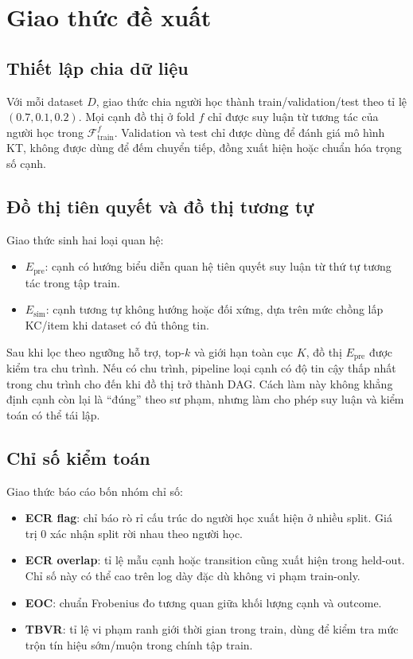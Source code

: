 \documentclass[runningheads]{llncs}
\newcommand{\Epre}{\ensuremath{E_{\text{pre}}}}
\newcommand{\Esim}{\ensuremath{E_{\text{sim}}}}
\begin{document}
\section{Giao thức đề xuất}
\subsection{Thiết lập chia dữ liệu}
Với mỗi dataset $D$, giao thức chia người học thành train/validation/test theo tỉ lệ $(0.7,0.1,0.2)$. Mọi cạnh đồ thị ở fold $f$ chỉ được suy luận từ tương tác của người học trong $\mathcal{F}_{\text{train}}^f$. Validation và test chỉ được dùng để đánh giá mô hình KT, không được dùng để đếm chuyển tiếp, đồng xuất hiện hoặc chuẩn hóa trọng số cạnh.

\subsection{Đồ thị tiên quyết và đồ thị tương tự}
Giao thức sinh hai loại quan hệ:
\begin{itemize}
  \item $\Epre$: cạnh có hướng biểu diễn quan hệ tiên quyết suy luận từ thứ tự tương tác trong tập train.
  \item $\Esim$: cạnh tương tự không hướng hoặc đối xứng, dựa trên mức chồng lấp KC/item khi dataset có đủ thông tin.
\end{itemize}
Sau khi lọc theo ngưỡng hỗ trợ, top-$k$ và giới hạn toàn cục $K$, đồ thị $\Epre$ được kiểm tra chu trình. Nếu có chu trình, pipeline loại cạnh có độ tin cậy thấp nhất trong chu trình cho đến khi đồ thị trở thành DAG. Cách làm này không khẳng định cạnh còn lại là ``đúng'' theo sư phạm, nhưng làm cho phép suy luận và kiểm toán có thể tái lập.

\subsection{Chỉ số kiểm toán}
Giao thức báo cáo bốn nhóm chỉ số:
\begin{itemize}
  \item \textbf{ECR flag}: chỉ báo rò rỉ cấu trúc do người học xuất hiện ở nhiều split. Giá trị $0$ xác nhận split rời nhau theo người học.
  \item \textbf{ECR overlap}: tỉ lệ mẫu cạnh hoặc transition cũng xuất hiện trong held-out. Chỉ số này có thể cao trên log dày đặc dù không vi phạm train-only.
  \item \textbf{EOC}: chuẩn Frobenius đo tương quan giữa khối lượng cạnh và outcome.
  \item \textbf{TBVR}: tỉ lệ vi phạm ranh giới thời gian trong train, dùng để kiểm tra mức trộn tín hiệu sớm/muộn trong chính tập train.
\end{itemize}
\end{document}
